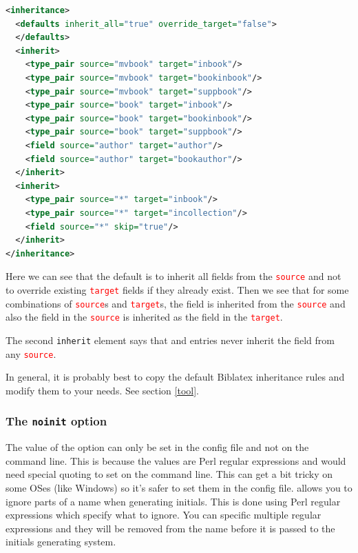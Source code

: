 \documentclass{ltxdockit}
\newcommand*{\biblatex}{Biblatex\xspace}
\begin{document}
\begin{lstlisting}[language=xml,escapechar=+,mathescape=true]
<inheritance>
  <defaults inherit_all="true" override_target="false">
  </defaults>
  <inherit>
    <type_pair source="mvbook" target="inbook"/>
    <type_pair source="mvbook" target="bookinbook"/>
    <type_pair source="mvbook" target="suppbook"/>
    <type_pair source="book" target="inbook"/>
    <type_pair source="book" target="bookinbook"/>
    <type_pair source="book" target="suppbook"/>
    <field source="author" target="author"/>
    <field source="author" target="bookauthor"/>
  </inherit>
  <inherit>
    <type_pair source="*" target="inbook"/>
    <type_pair source="*" target="incollection"/>
    <field source="*" skip="true"/>
  </inherit>
</inheritance>
\end{lstlisting}
%
Here we can see that the default is to inherit all fields from the
\textcolor{red}{\texttt{source}} and not to override existing
\textcolor{red}{\texttt{target}} fields if they already exist. Then we see
that for some combinations of \textcolor{red}{\texttt{source}}s and
\textcolor{red}{\texttt{target}}s, the  field is inherited
from the \textcolor{red}{\texttt{source}} and also the 
field in the \textcolor{red}{\texttt{source}} is inherited as the
 field in the \textcolor{red}{\texttt{target}}.

The second \texttt{inherit} element says that  and
 entries never inherit the 
field from any \textcolor{red}{\texttt{source}}.

In general, it is probably best to copy the default \biblatex inheritance
rules and modify them to your needs. See section \ref{tool}.
\bigskip
\subsubsection{The \texttt{noinit} option}\label{noinit}

The value of the  option can only be set in the config file and
not on the command line. This is because the values are Perl regular
expressions and would need special quoting to set on the command line. This
can get a bit tricky on some OSes (like Windows) so it's safer to set them
in the config file.  allows you to ignore parts of a name when
generating initials. This is done using Perl regular expressions which
specify what to ignore. You can specific multiple regular expressions and
they will be removed from the name before it is passed to the initials
generating system.
\end{document}

